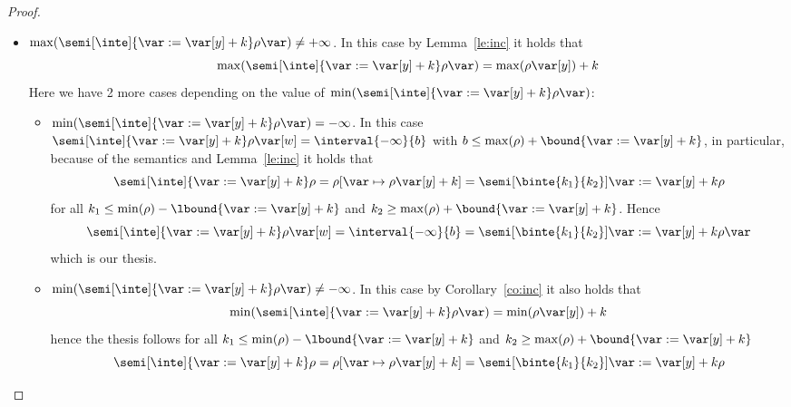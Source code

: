 \begin{proof}
\begin{itemize}
\begin{itemize}
    \end{itemize}
  \item
    \({\max(\semi[\inte]{\var := \var[y] + k}\rho\var)} \neq
    +\infty\). In this case by Lemma~\ref{le:inc} it holds that
    \begin{equation*}
      \max(\semi[\inte]{\var:= \var[y] + k}\rho\var) = \max(\rho\var[y]) + k
    \end{equation*}
    Here we have 2 more cases depending on the value of
    \(\min(\semi[\inte]{\var:= \var[y] + k}\rho\var)\):
    \begin{itemize}
    \item
      \({\min(\semi[\inte]{\var:= \var[y] + k}\rho\var)} =
      -\infty\). In this case
      \(\semi[\inte]{\var := \var[y] + k}\rho\var[w] =
      \interval{-\infty}{b}\) with
      \(b \leq \max(\rho) + \bound{\var := \var[y] + k}\), in
      particular, because of the semantics and Lemma~\ref{le:inc} it
      holds that
      \begin{equation*}
        \semi[\inte]{\var := \var[y] + k}\rho = \rho[\var \mapsto \rho\var[y] + k] = \semi[\binte{k_1}{k_2}]{\var := \var[y] + k}\rho
      \end{equation*}
      for all \(k_1 \leq \min(\rho) - \lbound{\var := \var[y] + k}\)
      and \(k_2 \geq \max(\rho) + \bound{\var := \var[y] + k}\). Hence
      \begin{equation*}
        \semi[\inte]{\var := \var[y] + k}\rho\var[w] = \interval{-\infty}{b} = \semi[\binte{k_1}{k_2}]{\var:=\var[y]+k}\rho\var
      \end{equation*}
      which is our thesis.
      
    \item
      \({\min(\semi[\inte]{\var:= \var[y] + k}\rho\var)} \neq
      -\infty\). In this case by Corollary~\ref{co:inc} it also holds
      that
      \begin{equation*}
        \min(\semi[\inte]{\var := \var[y] + k}\rho\var) = \min(\rho\var[y]) + k
      \end{equation*}
      hence the thesis follows for all
      \(k_1 \leq \min(\rho) - \lbound{\var := \var[y] + k}\) and
      \(k_2 \geq \max(\rho) + \bound{\var := \var[y] + k}\)
      \begin{equation*}
        \semi[\inte]{\var := \var[y] + k}\rho = \rho[\var \mapsto \rho\var[y] + k] = \semi[\binte{k_1}{k_2}]{\var := \var[y] + k}\rho
      \end{equation*}
    \end{itemize}
  \end{itemize}
  

\end{proof}
